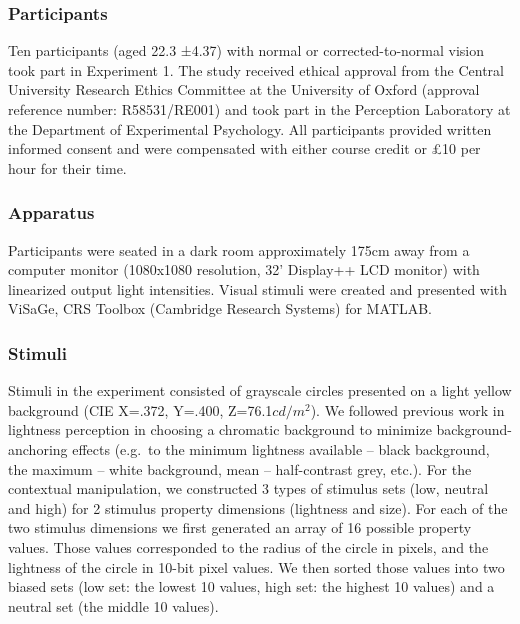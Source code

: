\documentclass[a4paper, nobind]{templates/ociamthesis}
\begin{document}
\hypertarget{participants-4}{%
\subsubsection{Participants}\label{participants-4}}

Ten participants (aged 22.3 ±4.37) with normal or corrected-to-normal vision took part in Experiment 1. The study received ethical approval from the Central University Research Ethics Committee at the University of Oxford (approval reference number: R58531/RE001) and took part in the Perception Laboratory at the Department of Experimental Psychology. All participants provided written informed consent and were compensated with either course credit or £10 per hour for their time.

\hypertarget{apparatus-3}{%
\subsubsection{Apparatus}\label{apparatus-3}}

Participants were seated in a dark room approximately 175cm away from a computer monitor (1080x1080 resolution, 32' Display++ LCD monitor) with linearized output light intensities. Visual stimuli were created and presented with ViSaGe, CRS Toolbox (Cambridge Research Systems) for MATLAB.

\hypertarget{stimuli-3}{%
\subsubsection{Stimuli}\label{stimuli-3}}

Stimuli in the experiment consisted of grayscale circles presented on a light yellow background (CIE X=.372, Y=.400, Z=76.1\(cd/m^2\)). We followed previous work in lightness perception in choosing a chromatic background to minimize background-anchoring effects (e.g.~to the minimum lightness available -- black background, the maximum -- white background, mean -- half-contrast grey, etc.). For the contextual manipulation, we constructed 3 types of stimulus sets (low, neutral and high) for 2 stimulus property dimensions (lightness and size). For each of the two stimulus dimensions we first generated an array of 16 possible property values. Those values corresponded to the radius of the circle in pixels, and the lightness of the circle in 10-bit pixel values. We then sorted those values into two biased sets (low set: the lowest 10 values, high set: the highest 10 values) and a neutral set (the middle 10 values).
\end{document}

